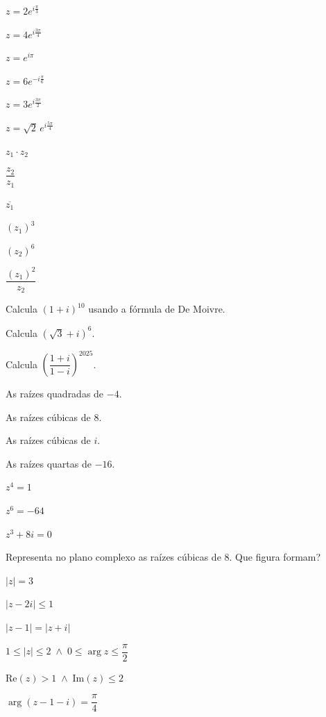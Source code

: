 \documentclass[12pt]{article}
\begin{document}
\begin{exercicios}
  \item $z = 2e^{i\frac{\pi}{3}}$
  \item $z = 4e^{i\frac{3\pi}{4}}$
  \item $z = e^{i\pi}$
  \item $z = 6e^{-i\frac{\pi}{6}}$
  \item $z = 3e^{i\frac{3\pi}{2}}$
  \item $z = \sqrt{2}\,e^{i\frac{5\pi}{4}}$
\end{exercicios}

\begin{exercicios}
  \item $z_1 \cdot z_2$
  \item $\dfrac{z_2}{z_1}$
  \item $\overline{z_1}$
  \item $(z_1)^3$
  \item $(z_2)^6$
  \item $\dfrac{(z_1)^2}{z_2}$
  \item Calcula $(1 + i)^{10}$ usando a fórmula de De Moivre.
  \item Calcula $\left(\sqrt{3} + i\right)^6$.
  \item Calcula $\left(\dfrac{1 + i}{1 - i}\right)^{2025}$.
\end{exercicios}

\begin{exercicios}
  \item As raízes quadradas de $-4$.
  \item As raízes cúbicas de $8$.
  \item As raízes cúbicas de $i$.
  \item As raízes quartas de $-16$.
  \item $z^4 = 1$
  \item $z^6 = -64$
  \item $z^3 + 8i = 0$
  \item Representa no plano complexo as raízes cúbicas de 8. Que figura formam?
\end{exercicios}

\begin{exercicios}
  \item $|z| = 3$
  \item $|z - 2i| \le 1$
  \item $|z - 1| = |z + i|$
  \item $1 \le |z| \le 2 \;\wedge\; 0 \le \arg z \le \dfrac{\pi}{2}$
  \item $\text{Re}(z) > 1 \;\wedge\; \text{Im}(z) \le 2$
  \item $\arg(z - 1 - i) = \dfrac{\pi}{4}$
\end{exercicios}
\end{document}
